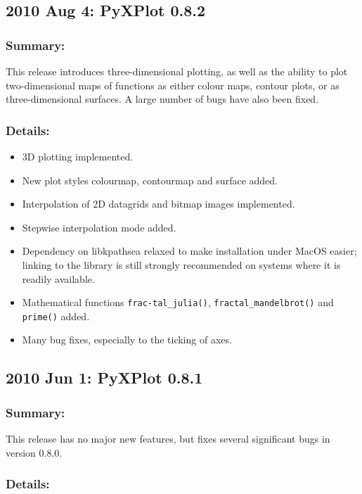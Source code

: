 \subsection*{2010 Aug 4: PyXPlot 0.8.2}

\subsubsection*{Summary:}

This release introduces three-dimensional plotting, as well as the ability to plot two-dimensional maps of functions as either colour maps, contour plots, or as three-dimensional surfaces. A large number of bugs have also been fixed.

\subsubsection*{Details:}

\begin{itemize}
\item 3D plotting implemented.
\item New plot styles colourmap, contourmap and surface added.
\item Interpolation of 2D datagrids and bitmap images implemented.
\item Stepwise interpolation mode added.
\item Dependency on libkpathsea relaxed to make installation under MacOS easier; linking to the library is still strongly recommended on systems where it is readily available.
\item Mathematical functions {\tt frac-tal\_\-julia()}, {\tt frac\-tal\_\-man\-del\-brot()} and {\tt prime()} added.
\item Many bug fixes, especially to the ticking of axes.
\end{itemize}

\subsection*{2010 Jun 1: PyXPlot 0.8.1}

\subsubsection*{Summary:}

This release has no major new features, but fixes several significant bugs in version 0.8.0.

\subsubsection*{Details:}

